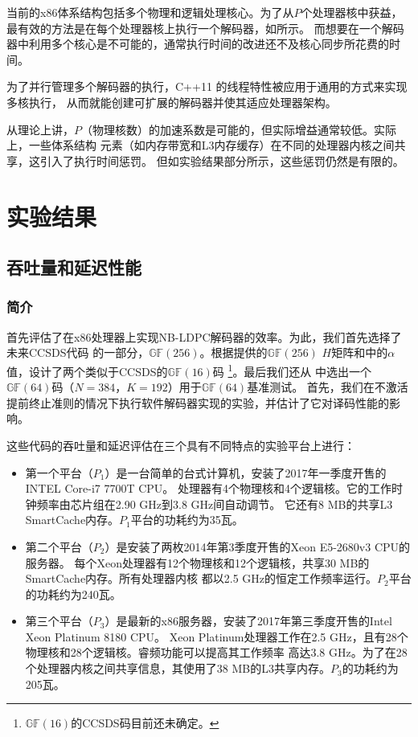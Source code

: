 \documentclass{cjc}
\begin{document}
  当前的x86体系结构包括多个物理和逻辑处理核心。为了从$P$个处理器核中获益，
  最有效的方法是在每个处理器核上执行一个解码器，如\cite{gal_high-throughput_2016}所示。
  而想要在一个解码器中利用多个核心是不可能的，通常执行时间的改进还不及核心同步所花费的时间。

  为了并行管理多个解码器的执行，C++11 的线程特性被应用于通用的方式来实现多核执行，
  从而就能创建可扩展的解码器并使其适应处理器架构。

  从理论上讲，$P$（物理核数）的加速系数是可能的，但实际增益通常较低。实际上，一些体系结构
  元素（如内存带宽和L3内存缓存）在不同的处理器内核之间共享，这引入了执行时间惩罚。
  但如实验结果部分所示，这些惩罚仍然是有限的。

\section{实验结果}\label{sec:experiment}
\subsection{吞吐量和延迟性能}
\subsubsection{简介}\label{sssec:experiment11}

  首先评估了在x86处理器上实现NB-LDPC解码器的效率。为此，我们首先选择了未来CCSDS代码\cite{CCSDS_2015}
  的一部分，$\mathbb{GF}(256)$。根据\cite{dolecek_non-binary_2014}提供的$\mathbb{GF}(256)$
  $H$矩阵和\cite{poulliat_design_2008}中的$\alpha$值，设计了两个类似于CCSDS的$\mathbb{GF}(16)$码
  \footnote{$\mathbb{GF}(16)$的CCSDS码目前还未确定。}。最后我们还从\cite{noauthor_helmling_nodate}
  中选出一个$\mathbb{GF}(64)$码（$N=384，K=192$）用于$\mathbb{GF}(64)$基准测试。
  首先，我们在不激活提前终止准则的情况下执行软件解码器实现的实验，并估计了它对译码性能的影响。
  
  这些代码的吞吐量和延迟评估在三个具有不同特点的实验平台上进行：
\begin{itemize}
  \item 第一个平台（$P_1$）是一台简单的台式计算机，安装了2017年一季度开售的INTEL Core-i7 7700T CPU。
  处理器有4个物理核和4个逻辑核。它的工作时钟频率由芯片组在2.90 GHz到3.8 GHz间自动调节。
  它还有8 MB的共享L3 SmartCache内存。$P_1$平台的功耗约为35瓦。 
  \item 第二个平台（$P_2$）是安装了两枚2014年第3季度开售的Xeon E5-2680v3 CPU的服务器。
  每个Xeon处理器有12个物理核和12个逻辑核，共享30 MB的SmartCache内存。所有处理器内核
  都以2.5 GHz的恒定工作频率运行。$P_2$平台的功耗约为240瓦。
  \item 第三个平台（$P_3$）是最新的x86服务器，安装了2017年第三季度开售的Intel Xeon Platinum 8180 CPU。
  Xeon Platinum处理器工作在2.5 GHz，且有28个物理核和28个逻辑核。睿频功能可以提高其工作频率
  高达3.8 GHz。为了在28个处理器内核之间共享信息，其使用了38 MB的L3共享内存。$P_3$的功耗约为205瓦。
\end{itemize}
  
\end{document}
